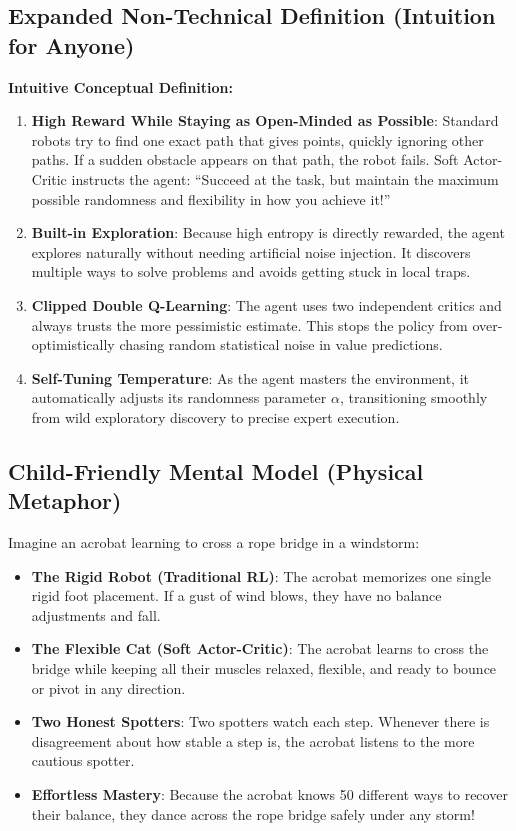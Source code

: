 \documentclass[11pt,a4paper]{article}
\theoremstyle{definition}
\begin{document}
\subsection{Expanded Non-Technical Definition (Intuition for Anyone)}
\textbf{Intuitive Conceptual Definition:}
\begin{enumerate}
    \item \textbf{High Reward While Staying as Open-Minded as Possible}: Standard robots try to find one exact path that gives points, quickly ignoring other paths. If a sudden obstacle appears on that path, the robot fails. Soft Actor-Critic instructs the agent: ``Succeed at the task, but maintain the maximum possible randomness and flexibility in how you achieve it!''
    \item \textbf{Built-in Exploration}: Because high entropy is directly rewarded, the agent explores naturally without needing artificial noise injection. It discovers multiple ways to solve problems and avoids getting stuck in local traps.
    \item \textbf{Clipped Double Q-Learning}: The agent uses two independent critics and always trusts the more pessimistic estimate. This stops the policy from over-optimistically chasing random statistical noise in value predictions.
    \item \textbf{Self-Tuning Temperature}: As the agent masters the environment, it automatically adjusts its randomness parameter $\alpha$, transitioning smoothly from wild exploratory discovery to precise expert execution.
\end{enumerate}

\subsection{Child-Friendly Mental Model (Physical Metaphor)}
Imagine an acrobat learning to cross a rope bridge in a windstorm:
\begin{itemize}
    \item \textbf{The Rigid Robot (Traditional RL)}: The acrobat memorizes one single rigid foot placement. If a gust of wind blows, they have no balance adjustments and fall.
    \item \textbf{The Flexible Cat (Soft Actor-Critic)}: The acrobat learns to cross the bridge while keeping all their muscles relaxed, flexible, and ready to bounce or pivot in any direction.
    \item \textbf{Two Honest Spotters}: Two spotters watch each step. Whenever there is disagreement about how stable a step is, the acrobat listens to the more cautious spotter.
    \item \textbf{Effortless Mastery}: Because the acrobat knows 50 different ways to recover their balance, they dance across the rope bridge safely under any storm!
\end{itemize}
\end{document}
